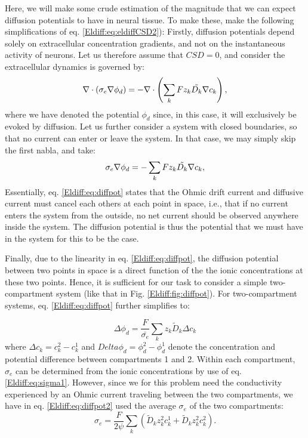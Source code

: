 \subsubsection{}
Here, we will make some crude estimation of the magnitude that we can expect diffusion potentials to have in neural tissue. To make these, make the following simplifications of eq. \ref{Eldiff:eq:eldiffCSD2}): Firstly, diffusion potentials depend solely on extracellular concentration gradients, and not on the instantaneous activity of neurons. Let us therefore assume that $CSD = 0$, and consider the extracellular dynamics is governed by:
\begin{equation}
\nabla \cdot (\sigma_e\nabla\phi_d) = - \nabla \cdot \left (\sum_k{F z_k \tilde{D_k}{\bf \nabla} c_{k}} \right), 
\label{Eldiff:eq:eldiffCSD3}
\end{equation}
where we have denoted the potential $\phi_d$ since, in this case, it will exclusively be evoked by diffusion. Let us further consider a system with closed boundaries, so that no current can enter or leave the system. In that case, we may simply skip the first nabla, and take:
\begin{equation}
\sigma_e\nabla\phi_d = -\sum_k{F z_k \tilde{D_k}{\bf \nabla} c_{k}}, 
\label{Eldiff:eq:diffpot}
\end{equation}
Essentially, eq. \ref{Eldiff:eq:diffpot} states that the Ohmic drift current and diffusive current must cancel each others at each point in space, i.e., that if no current enters the system from the outside, no net current should be observed anywhere inside the system. The diffusion potential is thus the potential that we must have in the system for this to be the case. 

Finally, due to the linearity in eq. \ref{Eldiff:eq:diffpot}, the diffusion potential between two points in space is a direct function of the the ionic concentrations at these two points. Hence, it is sufficient for our task to consider a simple two-compartment system (like that in Fig. \ref{Eldiff:fig:diffpot}). For two-compartment systems, eq. \ref{Eldiff:eq:diffpot} further simplifies to:

\begin{equation}
\Delta \phi_d = \frac{F}{\bar{\sigma_e}} \sum_k{z_k \tilde{D}_k \Delta c_k}
\label{Eldiff:eq:diffpot2}
\end{equation}
where $\Delta c_k = c_{k}^{2} - c_{k}^{1}$ and $Delta \phi_d = \phi_d^{2} - \phi_d^{1}$ denote the concentration and potential difference between compartments 1 and 2. Within each compartment, $\sigma_e$ can be determined from the ionic concentrations by use of eq. \ref{Eldiff:eq:sigma1}. However, since we for this problem need the conductivity experienced by an Ohmic current traveling between the two compartments, we have in eq. \ref{Eldiff:eq:diffpot2} used the average $\sigma_e$ of the two compartments:
\begin{equation}
\sigma_e = \frac{F}{2\psi}\sum_{k} \left(\tilde{D}_k z_{k}^2 c_{k}^{1} + \tilde{D}_k z_{k}^2 c_{k}^{2} \right).
\label{Eldiff:eq:sigma2}
\end{equation}


